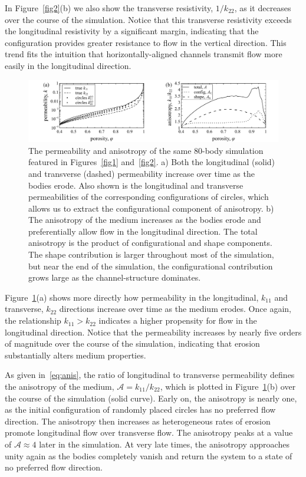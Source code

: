 \documentclass[3p]{elsarticle}
\newcommand{\anis}{\mathcal{A}}
\begin{document}
In Figure~\ref{fig2}(b) we also show the transverse resistivity, $1/k_{22}$, as it decreases over the course of the simulation. Notice that this transverse resistivity exceeds the longitudinal resistivity by a significant margin, indicating that the configuration provides greater resistance to flow in the vertical direction. This trend fits the intuition that horizontally-aligned channels transmit flow more easily in the longitudinal direction.

\begin{figure}%
\centering
\includegraphics[width = 0.99 \textwidth]{./figs/fig3.pdf}
\caption{
The permeability and anisotropy of the same 80-body simulation featured in Figures~\ref{fig1} and~\ref{fig2}. a) Both the longitudinal (solid) and transverse (dashed) permeability increase over time as the bodies erode. Also shown is the longitudinal and transverse permeabilities of the corresponding configurations of circles, which allows us to extract the configurational component of anisotropy. b) The anisotropy of the medium increases as the bodies erode and preferentially allow flow in the longitudinal direction. The total anisotropy is the product of configurational and shape components. The shape contribution is larger throughout most of the simulation, but near the end of the simulation, the configurational contribution grows large as the channel-structure dominates.
\label{fig3}
}
\end{figure}

Figure~\ref{fig3}(a) shows more directly how permeability in the longitudinal, $k_{11}$ and transverse, $k_{22}$ directions increase over time as the medium erodes. Once again, the relationship $k_{11} > k_{22}$ indicates a higher propensity for flow in the longitudinal direction. Notice that the permeability increases by nearly five orders of magnitude over the course of the simulation, indicating that erosion substantially alters medium properties.

As given in~\eqref{eq:anis}, the ratio of longitudinal to transverse permeability defines the anisotropy of the medium, $\anis = k_{11} / k_{22}$, which is plotted in Figure~\ref{fig3}(b) over the course of the simulation (solid curve). Early on, the anisotropy is nearly one, as the initial configuration of randomly placed circles has no preferred flow direction. The anisotropy then increases as heterogeneous rates of erosion promote longitudinal flow over transverse flow. The anisotropy peaks at a value of $\anis \approx 4$ later in the simulation. At very late times, the anisotropy approaches unity again as the bodies completely vanish and return the system to a state of no preferred flow direction.
\end{document}
